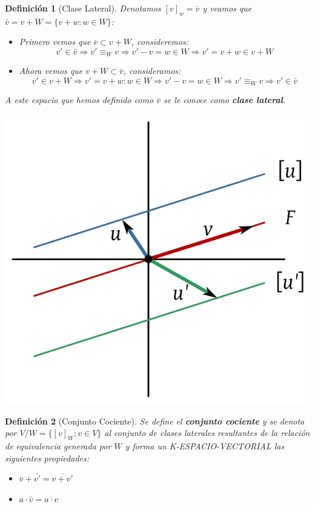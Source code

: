 \documentclass[10pt,a4paper,openright]{book}
\theoremstyle{break}
\newtheorem*{defi}{Definición}
\begin{document}
\begin{defi}[Clase Lateral]
Denotamos $[v]_w=\bar{v}$ y veamos que $\bar{v}=v+W=\{v+w: w\in W\}$:
\begin{itemize}
\item Primero vemos que $\bar{v}\subset v+W$, consideremos:
$$v'\in\bar{v}\Rightarrow v'\equiv_W v\Rightarrow v'-v=w\in W\Rightarrow v'=v+w\in v+ W$$

\item Ahora vemos que $v+W\subset \bar{v}$, consideramos:
$$v'\in v+W\Rightarrow v'=v+w : w\in W\Rightarrow v'-v=w\in W\Rightarrow v'\equiv_W v\Rightarrow v'\in \bar{v}$$
\end{itemize}

A este espacio que hemos definido como $\bar{v}$ se le conoce como \textbf{clase lateral}.
\begin{center}
\includegraphics[scale=0.25]{clase lateral}
\end{center}
\end{defi}

\begin{defi}[Conjunto Cociente]
Se define el \textbf{conjunto cociente} y se denota por $V/W = \{[v]_W: v\in V\}$ al conjunto de clases laterales resultantes de la relación de equivalencia generada por $W$ y forma un K-ESPACIO-VECTORIAL las siguientes propiedades:
\begin{itemize}
\item $\bar{v}+\bar{v'}=\overline{v+v'}$
\item $a\cdot \bar{v}=\overline{a\cdot v}$
\end{itemize}
\end{defi}
\end{document}
